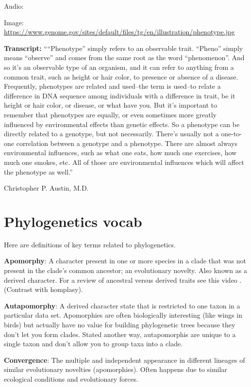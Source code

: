 \documentclass[
]{book}
\begin{document}
Audio:

Image: \url{https://www.genome.gov/sites/default/files/tg/en/illustration/phenotype.jpg}

\textbf{Transcript:} ````Phenotype'' simply refers to an observable trait. ``Pheno'' simply means ``observe'' and comes from the same root as the word ``phenomenon''. And so it's an observable type of an organism, and it can refer to anything from a common trait, such as height or hair color, to presence or absence of a disease. Frequently, phenotypes are related and used--the term is used--to relate a difference in DNA sequence among individuals with a difference in trait, be it height or hair color, or disease, or what have you. But it's important to remember that phenotypes are equally, or even sometimes more greatly influenced by environmental effects than genetic effects. So a phenotype can be directly related to a genotype, but not necessarily. There's usually not a one-to-one correlation between a genotype and a phenotype. There are almost always environmental influences, such as what one eats, how much one exercises, how much one smokes, etc. All of those are environmental influences which will affect the phenotype as well.''

Christopher P. Austin, M.D.

\hypertarget{phylogenetics-vocab}{%
\section{Phylogenetics vocab}\label{phylogenetics-vocab}}

Here are definitions of key terms related to phylogenetics.

\textbf{Apomorphy}: A character present in one or more species in a clade that was not present in the clade's common ancestor; an evolutionary novelty. Also known as a derived character. For a review of ancestral versus derived traits see this video . (Contrast with homplasy).

\textbf{Autapomorphy}: A derived character state that is restricted to one taxon in a particular data set. Apomorphies are often biologically interesting (like wings in birds) but actually have no value for building phylogenetic trees because they don't let you form clades. Stated another way, autapomorphis are unique to a single taxon and don't allow you to group taxa into a clade.

\textbf{Convergence}: The multiple and independent appearance in different lineages of similar evolutionary novelties (apomorphies). Often happens due to similar ecological conditions and evolutionary forces.
\end{document}
